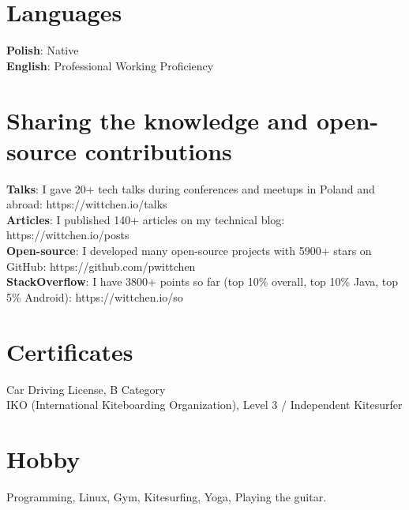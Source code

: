 \documentclass[letterpaper,11pt]{article}
\begin{document}
\section{Languages}
 \begin{itemize}[leftmargin=0.15in, label={}]
    \small{\item{
     \textbf{Polish}{: Native} \\
     \textbf{English}{: Professional Working Proficiency} \\
    }}
 \end{itemize}

\section{Sharing the knowledge and open-source contributions}
 \begin{itemize}[leftmargin=0.15in, label={}]
    \small{\item{
     \textbf{Talks}{: I gave 20+ tech talks during conferences and meetups in Poland and abroad: https://wittchen.io/talks} \\
     \textbf{Articles}{: I published 140+ articles on my technical blog: https://wittchen.io/posts} \\
     \textbf{Open-source}{: I developed many open-source projects with 5900+ stars on GitHub: https://github.com/pwittchen} \\
     \textbf{StackOverflow}{: I have 3800+ points so far (top 10\% overall, top 10\% Java, top 5\% Android): https://wittchen.io/so}
    }}
 \end{itemize}

\section{Certificates}
 \begin{itemize}[leftmargin=0.15in, label={}]
    \small{\item{
    {Car Driving License, B Category} \\
    {IKO (International Kiteboarding Organization), Level 3 / Independent Kitesurfer}\\
    }}
 \end{itemize}

\section{Hobby}
 \begin{itemize}[leftmargin=0.15in, label={}]
    \small{\item{
     Programming, Linux, Gym, Kitesurfing, Yoga, Playing the guitar.\\
    }}
 \end{itemize}
\end{document}
